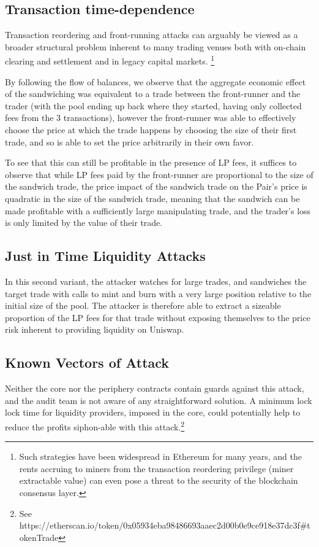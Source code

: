 \documentclass[runningheads]{llncs}
\begin{document}
\subsection{Transaction time-dependence}
Transaction reordering and front-running attacks can arguably be viewed as a broader structural problem inherent to many trading venues both with on-chain clearing and settlement and in legacy capital markets. 
\footnote{Such strategies have been widespread in Ethereum for many years, and the rents accruing to miners from the transaction reordering privilege (miner extractable value) can even pose a threat to the security of the blockchain consensus layer.}

By following the flow of balances, we observe that the aggregate economic effect of the sandwiching was equivalent to a trade between the front-runner and the trader (with the pool ending up back where they started, having only collected fees from the 3 transactions), however the front-runner was able to effectively choose the price at which the trade happens by choosing the size of their first trade, and so is able to set the price arbitrarily in their own favor. 
\newline

To see that this can still be profitable in the presence of LP fees, it suffices to observe that while LP fees paid by the front-runner are proportional to the size of the sandwich trade, the price impact of the sandwich trade on the Pair's price is quadratic in the size of the sandwich trade, meaning that the sandwich can be made profitable with a sufficiently large manipulating trade, and the trader's loss is only limited by the value of their trade.

\subsection{Just in Time Liquidity Attacks}
In this second variant, the attacker watches for large trades, and sandwiches the target trade with calls to mint and burn with a very large position relative to the initial size of the pool. The attacker is therefore able to extract a sizeable proportion of the LP fees for that trade without exposing themselves to the price risk inherent to providing liquidity on Uniswap.

\subsection{Known Vectors of Attack}
Neither the core nor the periphery contracts contain guards against this attack, and the audit team is not aware of any straightforward solution. A minimum lock lock time for liquidity providers, imposed in the core, could potentially help to reduce the profits siphon-able with this attack.\footnote{See https://etherscan.io/token/0x05934eba98486693aaec2d00b0e9ce918e37dc3f#tokenTrade}
\newpage 
\end{document}
